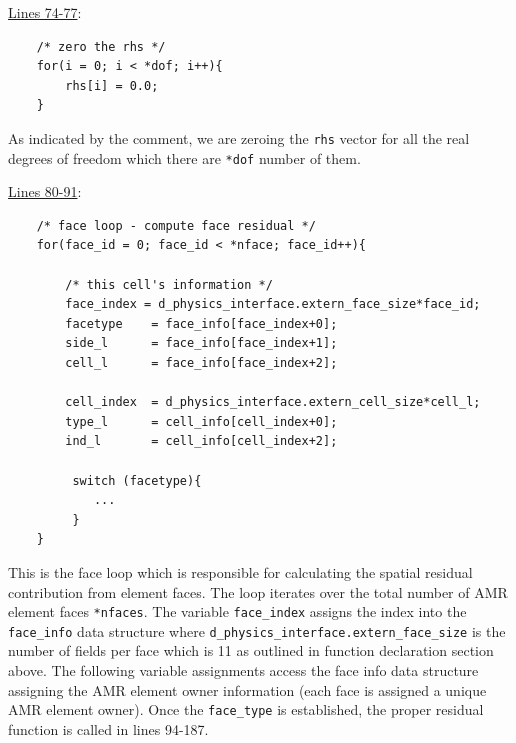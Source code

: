 \documentclass[11pt]{book}
\begin{document}
\noindent 
\underline{Lines 74-77}:
\begin{verbatim}
    /* zero the rhs */
    for(i = 0; i < *dof; i++){
        rhs[i] = 0.0;
    }
\end{verbatim}
As indicated by the comment, we are zeroing the \texttt{rhs} vector for all the real degrees of freedom which there are \texttt{*dof} number of them.
\bigskip

\noindent 
\underline{Lines 80-91}:
\begin{verbatim}
    /* face loop - compute face residual */
    for(face_id = 0; face_id < *nface; face_id++){
        
        /* this cell's information */
        face_index = d_physics_interface.extern_face_size*face_id;
        facetype    = face_info[face_index+0];
        side_l      = face_info[face_index+1];
        cell_l      = face_info[face_index+2];
        
        cell_index  = d_physics_interface.extern_cell_size*cell_l;
        type_l      = cell_info[cell_index+0];
        ind_l       = cell_info[cell_index+2];
        
         switch (facetype){
            ...
         }
    }
\end{verbatim}
This is the face loop which is responsible for calculating the spatial residual contribution from element faces.
The loop iterates over the total number of AMR element faces \texttt{*nfaces}. 
The variable \texttt{face\_index} assigns the index into the \texttt{face\_info} data structure where 
\texttt{d\_physics\_interface.extern\_face\_size} 
is the number of fields per face which is 11 as outlined in function declaration section above. 
The following variable assignments access the face info data structure assigning the AMR element owner information 
(each face is assigned a unique AMR element owner). 
Once the \texttt{face\_type} is established, the proper residual function is called in lines 94-187.
\bigskip
\bigskip
\end{document}
